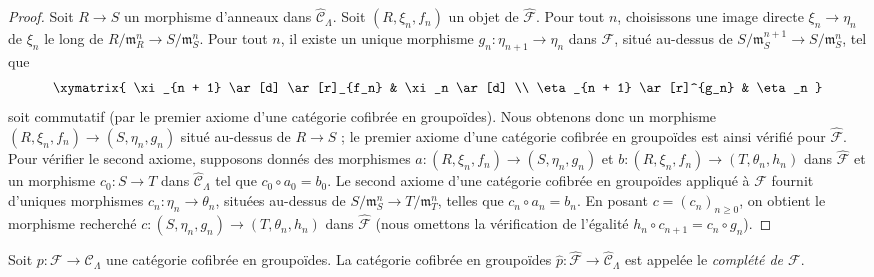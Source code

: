 \begin{proof}
Soit $R \to S$ un morphisme d'anneaux dans
$\widehat{\mathcal{C}}_\Lambda$. Soit $(R, \xi_n, f_n)$ un objet de
$\widehat{\mathcal{F}}$. Pour tout $n$, choisissons une image directe
$\xi_n \to \eta_n$ de $\xi_n$ le long de
$R/\mathfrak m_R^n \to S/\mathfrak m_S^n$. Pour tout $n$, il existe un unique
morphisme $g_n : \eta_{n + 1} \to \eta_n$ dans $\mathcal{F}$, situé au-dessus
de $S/\mathfrak m_S^{n + 1} \to S/\mathfrak m_S^n$, tel que
$$
\xymatrix{
\xi_{n + 1} \ar[d] \ar[r]_{f_n} & \xi_n \ar[d] \\
\eta_{n + 1} \ar[r]^{g_n} & \eta_n
}
$$
soit commutatif (par le premier axiome d'une catégorie cofibrée en
groupoïdes). Nous obtenons donc un morphisme
$(R, \xi_n, f_n) \to (S, \eta_n, g_n)$ situé au-dessus de $R \to S$ ; le
premier axiome d'une catégorie cofibrée en groupoïdes est ainsi vérifié pour
$\widehat{\mathcal{F}}$. Pour vérifier le second axiome, supposons donnés des
morphismes
$a : (R, \xi_n, f_n) \to (S, \eta_n, g_n)$ et
$b : (R, \xi_n, f_n) \to (T, \theta_n, h_n)$ dans $\widehat{\mathcal{F}}$
et un morphisme $c_0 : S \to T$ dans $\widehat{\mathcal{C}}_\Lambda$ tel que
$c_0 \circ a_0 = b_0$. Le second axiome d'une catégorie cofibrée en groupoïdes
appliqué à $\mathcal{F}$ fournit d'uniques morphismes
$c_n : \eta_n \to \theta_n$, situées au-dessus de
$S/\mathfrak m_S^n \to T/\mathfrak m_T^n$, telles que
$c_n \circ a_n = b_n$. En posant $c = (c_n)_{n \geq 0}$, on obtient le
morphisme recherché $c : (S, \eta_n, g_n) \to (T, \theta_n, h_n)$ dans
$\widehat{\mathcal{F}}$ (nous omettons la vérification de l'égalité
$h_n \circ c_{n + 1} = c_n \circ g_n$).
\end{proof}

\begin{definition}
\label{definition-completion}
Soit $p : \mathcal{F} \to \mathcal{C}_\Lambda$ une catégorie cofibrée en
groupoïdes. La catégorie cofibrée en groupoïdes
$\widehat{p} : \widehat{\mathcal  F} \to \widehat{\mathcal{C}}_\Lambda$
est appelée le {\it complété de $\mathcal{F}$}.
\end{definition}

